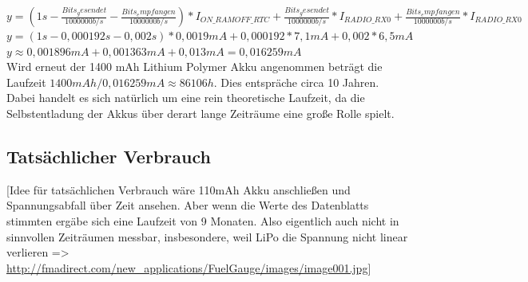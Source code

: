$y = (1s-\frac{Bits_gesendet}{1000000 b/s} - \frac{Bits_empfangen}{1000000 b/s})*I_{ON\_RAMOFF\_RTC} + \frac{Bits_gesendet}{1000000 b/s} * I_{RADIO\_RX0} + \frac{Bits_empfangen}{1000000 b/s} * I_{RADIO\_RX0}$\\[0.5cm]
$y = (1s - 0,000192s - 0,002s) * 0,0019mA + 0,000192 * 7,1mA + 0,002 * 6,5mA$\\[0.5cm]
$y \approx 0,001896mA + 0,001363mA + 0,013mA = 0,016259mA$ \\[1cm]

Wird erneut der 1400 mAh Lithium Polymer Akku angenommen beträgt die Laufzeit $1400mAh / 0,016259mA \approx 86106h$.
Dies entspräche circa 10 Jahren.\\
Dabei handelt es sich natürlich um eine rein theoretische Laufzeit, da die Selbstentladung der Akkus über derart lange Zeiträume eine große Rolle spielt. 

\subsection{Tatsächlicher Verbrauch}
[Idee für tatsächlichen Verbrauch wäre 110mAh Akku anschließen und Spannungsabfall über Zeit ansehen. Aber wenn die Werte des Datenblatts stimmten ergäbe sich eine Laufzeit von 9 Monaten. Also eigentlich auch nicht in sinnvollen Zeiträumen messbar, insbesondere, weil LiPo die Spannung nicht linear verlieren => \url{http://fmadirect.com/new_applications/FuelGauge/images/image001.jpg}]
